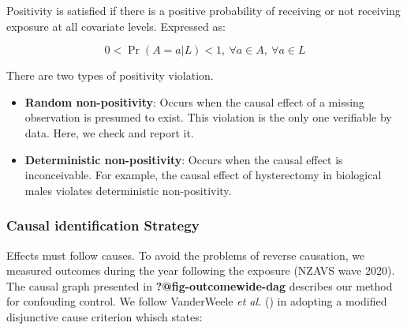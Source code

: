 \documentclass[
  singlecolumn,
  9pt]{article}
\begin{document}
Positivity is satisfied if there is a positive probability of receiving
or not receiving exposure at all covariate levels. Expressed as:

\begin{equation}
0 < \Pr(A=a|L)<1, ~ \forall a \in A, ~ \forall a \in L
\end{equation}

There are two types of positivity violation.

\begin{itemize}
\item
  \textbf{Random non-positivity}: Occurs when the causal effect of a
  missing observation is presumed to exist. This violation is the only
  one verifiable by data. Here, we check and report it.
\item
  \textbf{Deterministic non-positivity}: Occurs when the causal effect
  is inconceivable. For example, the causal effect of hysterectomy in
  biological males violates deterministic non-positivity.
\end{itemize}

\subsubsection{Causal identification
Strategy}\label{causal-identification-strategy}

Effects must follow causes. To avoid the problems of reverse causation,
we measured outcomes during the year following the exposure (NZAVS wave
2020). The causal graph presented in \textbf{?@fig-outcomewide-dag}
describes our method for confouding control. We follow VanderWeele
\emph{et al.} () in adopting a
modified disjunctive cause criterion whisch states:
\end{document}

